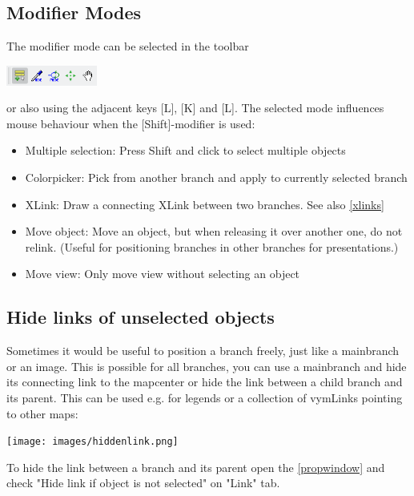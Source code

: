 \documentclass[12pt,a4paper]{article}
\newcommand{\key}[1]{[#1]}
\begin{document}
\subsection{Modifier Modes} 
The modifier mode can be selected in the toolbar
\begin{center}
    \includegraphics[width=3cm]{images/modmodes.png}
\end{center}
or also using the adjacent keys \key{L}, \key{K} and \key{L}.
The selected mode influences mouse behaviour when the \key{Shift}-modifier is
used:
\begin{itemize}
    \item Multiple selection: Press Shift and click to select multiple objects
    \item Colorpicker: Pick from another branch and apply to currently
        selected branch
    \item XLink: Draw a connecting XLink between two branches. See also
        \ref{xlinks}
    \item Move object: Move an object, but when releasing it over another one, do not relink.
        (Useful for positioning branches in other branches for presentations.)
    \item Move view: Only move view without selecting an object
\end{itemize}

\subsection{Hide links of unselected objects} \label{hidelink}
Sometimes it would be useful to position a branch freely, just like a
mainbranch or an image. This is possible for all branches, you can use a
mainbranch and hide its connecting link to the mapcenter or hide the
link between a child branch and its parent. This can be used e.g. for
legends or a collection of vymLinks pointing to other maps:
\begin{center}
    \texttt{[image: images/hiddenlink.png]}
\end{center}
To hide the link between a branch and its parent open the
\ref{propwindow} and check "Hide link if object is not selected" on
"Link" tab.
\end{document}
